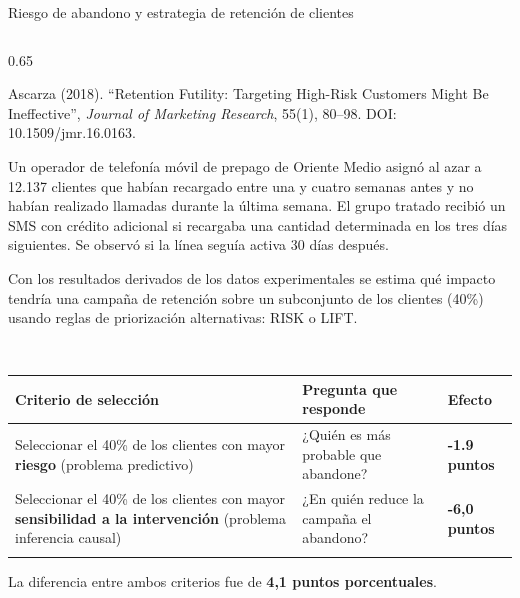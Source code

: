 \documentclass[
  8pt,
  ignorenonframetext,
  aspectratio=169,
  spanish,
]{beamer}
\newcommand{\lightrowrule}{\arrayrulecolor{black!25}\specialrule{0.4pt}{1pt}{1pt}\arrayrulecolor{black}}
\begin{document}
\begin{frame}[shrink]{Riesgo de abandono y estrategia de retención de
clientes}
\begin{columns}[T]
\begin{column}{0.65\linewidth}
\begin{tcolorbox}
Ascarza (2018). ``Retention Futility: Targeting High-Risk Customers
Might Be Ineffective'', \emph{Journal of Marketing Research}, 55(1),
80--98. DOI: 10.1509/jmr.16.0163.

Un operador de telefonía móvil de prepago de Oriente Medio asignó al
azar a 12.137 clientes que habían recargado entre una y cuatro semanas
antes y no habían realizado llamadas durante la última semana. El grupo
tratado recibió un SMS con crédito adicional si recargaba una cantidad
determinada en los tres días siguientes. Se observó si la línea seguía
activa 30 días después.

Con los resultados derivados de los datos experimentales se estima qué
impacto tendría una campaña de retención sobre un subconjunto de los
clientes (40\%) usando reglas de priorización alternativas: RISK o LIFT.

\end{tcolorbox}

~

\begin{longtable}[]{@{}
  >{\raggedright\arraybackslash}p{}
  >{\raggedright\arraybackslash}p{}
  >{\centering\arraybackslash}p{}@{}}
\toprule\noalign{}
\begin{minipage}[b]{\linewidth}\raggedright
Criterio de selección
\end{minipage} & \begin{minipage}[b]{\linewidth}\raggedright
Pregunta que responde
\end{minipage} & \begin{minipage}[b]{\linewidth}\centering
Efecto
\end{minipage} \\
\midrule\noalign{}
\endhead
\bottomrule\noalign{}
\endlastfoot
Seleccionar el 40\% de los clientes con mayor \textbf{riesgo} (problema
predictivo) & ¿Quién es más probable que abandone? & \textbf{-1.9
puntos} \\ \lightrowrule
Seleccionar el 40\% de los clientes con mayor \textbf{sensibilidad a la
intervención} (problema inferencia causal) & ¿En quién reduce la campaña
el abandono? & \textbf{-6,0 puntos} \\ \lightrowrule
\end{longtable}

La diferencia entre ambos criterios fue de \textbf{4,1 puntos
porcentuales}.
\end{column}
\end{columns}


\end{frame}
\end{document}
